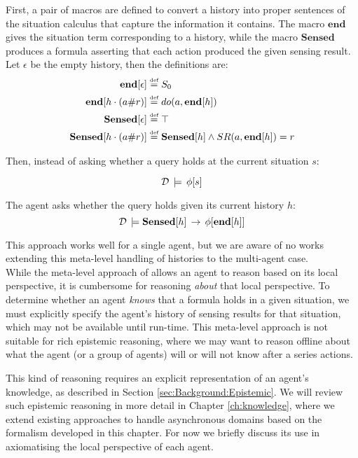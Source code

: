 First, a pair of macros are defined to convert a history into proper
sentences of the situation calculus that capture the information it
contains. The macro $\mathbf{end}$ gives the situation term corresponding
to a history, while the macro $\mathbf{Sensed}$ produces a formula
asserting that each action produced the given sensing result. Let
$\epsilon$ be the empty history, then the definitions are:\begin{alignat*}{1}
\mathbf{end}[\epsilon] & \stackrel{\mbox{\tiny def}}{=} S_{0}\\
\mathbf{end}[h\cdot(a\#r)] & \stackrel{\mbox{\tiny def}}{=} do(a,\mathbf{end}[h])\\
\mathbf{Sensed}[\epsilon] & \stackrel{\mbox{\tiny def}}{=}\top\\
\mathbf{Sensed}[h\cdot(a\#r)] & \stackrel{\mbox{\tiny def}}{=}\mathbf{Sensed}[h]\wedge SR(a,\mathbf{end}[h])=r\end{alignat*}


Then, instead of asking whether a query holds at the current situation
$s$:

\[
\mathcal{D}\,\models\,\phi[s]\]


The agent asks whether the query holds given its current history $h$:\[
\mathcal{D}\,\models\mathbf{Sensed}[h]\,\rightarrow\,\phi[\mathbf{end}[h]]\]


This approach works well for a single agent, but we are aware of no
works extending this meta-level handling of histories to the multi-agent
case.\\


While the meta-level approach of \citep{giacomo99indigolog} allows
an agent to reason based on its local perspective, it is cumbersome
for reasoning \emph{about} that local perspective. To determine whether
an agent \emph{knows} that a formula holds in a given situation, we
must explicitly specify the agent's history of sensing results for
that situation, which may not be available until run-time. This meta-level
approach is not suitable for rich epistemic reasoning, where we may
want to reason offline about what the agent (or a group of agents)
will or will not know after a series actions.

This kind of reasoning requires an explicit representation of an agent's
knowledge, as described in Section \ref{sec:Background:Epistemic}.
We will review such epistemic reasoning in more detail in Chapter
\ref{ch:knowledge}, where we extend existing approaches to handle
asynchronous domains based on the formalism developed in this chapter.
For now we briefly discuss its use in axiomatising the local perspective
of each agent.

